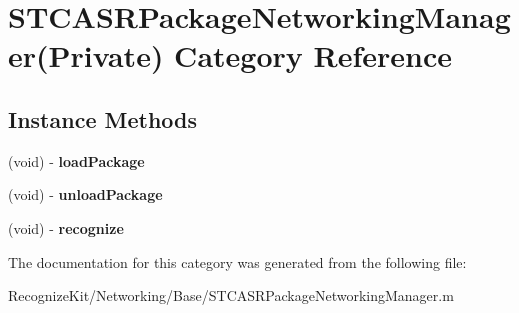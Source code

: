 \hypertarget{category_s_t_c_a_s_r_package_networking_manager_07_private_08}{}\section{S\+T\+C\+A\+S\+R\+Package\+Networking\+Manager(Private) Category Reference}
\label{category_s_t_c_a_s_r_package_networking_manager_07_private_08}
\subsection*{Instance Methods}
\begin{DoxyCompactItemize}
\item 
\hypertarget{category_s_t_c_a_s_r_package_networking_manager_07_private_08_ae76c7d7754a3a90a2d55906be0272ae6}{}\label{category_s_t_c_a_s_r_package_networking_manager_07_private_08_ae76c7d7754a3a90a2d55906be0272ae6} 
(void) -\/ {\bfseries load\+Package}
\item 
\hypertarget{category_s_t_c_a_s_r_package_networking_manager_07_private_08_ac2b255ddc03b37b842c4057629a27d08}{}\label{category_s_t_c_a_s_r_package_networking_manager_07_private_08_ac2b255ddc03b37b842c4057629a27d08} 
(void) -\/ {\bfseries unload\+Package}
\item 
\hypertarget{category_s_t_c_a_s_r_package_networking_manager_07_private_08_a018ee2f3d72600392335b98752f73c0c}{}\label{category_s_t_c_a_s_r_package_networking_manager_07_private_08_a018ee2f3d72600392335b98752f73c0c} 
(void) -\/ {\bfseries recognize}
\end{DoxyCompactItemize}


The documentation for this category was generated from the following file\+:\begin{DoxyCompactItemize}
\item 
Recognize\+Kit/\+Networking/\+Base/S\+T\+C\+A\+S\+R\+Package\+Networking\+Manager.\+m\end{DoxyCompactItemize}
